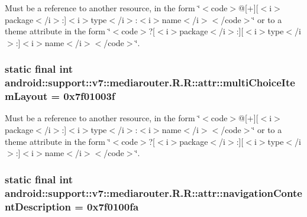 Must be a reference to another resource, in the form \char`\"{}$<$code$>$@\mbox{[}+\mbox{]}\mbox{[}$<$i$>$package$<$/i$>$:\mbox{]}$<$i$>$type$<$/i$>$:$<$i$>$name$<$/i$>$$<$/code$>$\char`\"{} or to a theme attribute in the form \char`\"{}$<$code$>$?\mbox{[}$<$i$>$package$<$/i$>$:\mbox{]}\mbox{[}$<$i$>$type$<$/i$>$:\mbox{]}$<$i$>$name$<$/i$>$$<$/code$>$\char`\"{}. \hypertarget{classandroid_1_1support_1_1v7_1_1mediarouter_1_1_r_1_1attr_a195d128d525e08364021fe4305285c6}{
\subsubsection[{multiChoiceItemLayout}]{\setlength{\rightskip}{0pt plus 5cm}static final int android::support::v7::mediarouter.R.R::attr::multiChoiceItemLayout = 0x7f01003f}}
\label{classandroid_1_1support_1_1v7_1_1mediarouter_1_1_r_1_1attr_a195d128d525e08364021fe4305285c6}


Must be a reference to another resource, in the form \char`\"{}$<$code$>$@\mbox{[}+\mbox{]}\mbox{[}$<$i$>$package$<$/i$>$:\mbox{]}$<$i$>$type$<$/i$>$:$<$i$>$name$<$/i$>$$<$/code$>$\char`\"{} or to a theme attribute in the form \char`\"{}$<$code$>$?\mbox{[}$<$i$>$package$<$/i$>$:\mbox{]}\mbox{[}$<$i$>$type$<$/i$>$:\mbox{]}$<$i$>$name$<$/i$>$$<$/code$>$\char`\"{}. \hypertarget{classandroid_1_1support_1_1v7_1_1mediarouter_1_1_r_1_1attr_68df6e98147ae425e1d8d1ece66c61ce}{
\subsubsection[{navigationContentDescription}]{\setlength{\rightskip}{0pt plus 5cm}static final int android::support::v7::mediarouter.R.R::attr::navigationContentDescription = 0x7f0100fa}}
\label{classandroid_1_1support_1_1v7_1_1mediarouter_1_1_r_1_1attr_68df6e98147ae425e1d8d1ece66c61ce}


